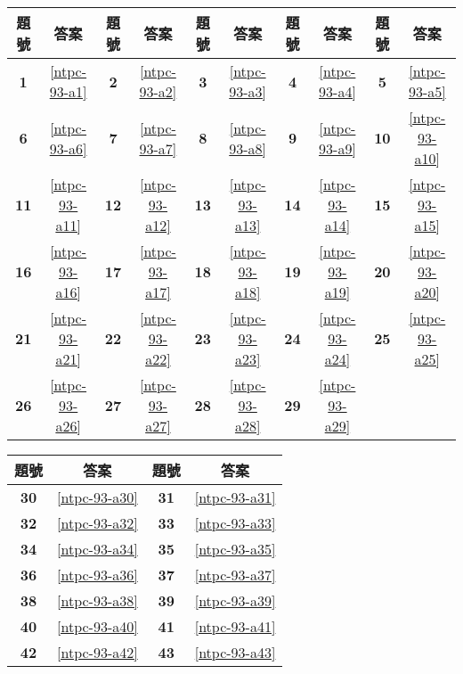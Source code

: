 \documentclass[12pt,a4paper]{report}
\begin{document}
\begin{CJK}{UTF8}{bkai}
\begin{table}[h]
  \center
  \begin{tabular}{|c|c|c|c|c|c|c|c|c|c|}
  \hline
  題號 & 答案 & 題號 & 答案 & 題號 & 答案 & 題號 & 答案 & 題號 & 答案\\
  \hline\hline
  \textbf{1}  & \ref{ntpc-93-a1} & \textbf{2}  & \ref{ntpc-93-a2} & \textbf{3}  & \ref{ntpc-93-a3} & \textbf{4}  & \ref{ntpc-93-a4} & \textbf{5}  & \ref{ntpc-93-a5}\\
  \hline
  \textbf{6}  & \ref{ntpc-93-a6} & \textbf{7}  & \ref{ntpc-93-a7} & \textbf{8}  & \ref{ntpc-93-a8} & \textbf{9}  & \ref{ntpc-93-a9} & \textbf{10} & \ref{ntpc-93-a10}\\
  \hline
  \textbf{11} & \ref{ntpc-93-a11} & \textbf{12} & \ref{ntpc-93-a12} & \textbf{13} & \ref{ntpc-93-a13} & \textbf{14} & \ref{ntpc-93-a14} & \textbf{15} & \ref{ntpc-93-a15}\\
  \hline
  \textbf{16} & \ref{ntpc-93-a16} & \textbf{17} & \ref{ntpc-93-a17} & \textbf{18} & \ref{ntpc-93-a18} & \textbf{19} & \ref{ntpc-93-a19} & \textbf{20} & \ref{ntpc-93-a20}\\
  \hline
  \textbf{21} & \ref{ntpc-93-a21} & \textbf{22} & \ref{ntpc-93-a22} & \textbf{23} & \ref{ntpc-93-a23} & \textbf{24} & \ref{ntpc-93-a24} & \textbf{25} & \ref{ntpc-93-a25}\\
  \hline
  \textbf{26} & \ref{ntpc-93-a26} & \textbf{27} & \ref{ntpc-93-a27} & \textbf{28} & \ref{ntpc-93-a28} & \textbf{29} & \ref{ntpc-93-a29} & &\\
  \hline
  \end{tabular}
\end{table}

\begin{table}[h]
  \center
  \begin{tabular}{|c|c|c|c|}
  \hline
  題號 & 答案 & 題號 & 答案\\
  \hline\hline
  \textbf{30} & \ref{ntpc-93-a30} & \textbf{31} & \ref{ntpc-93-a31}\\
  \hline
  \textbf{32} & \ref{ntpc-93-a32} & \textbf{33} & \ref{ntpc-93-a33}\\
  \hline
  \textbf{34} & \ref{ntpc-93-a34} & \textbf{35} & \ref{ntpc-93-a35}\\
  \hline
  \textbf{36} & \ref{ntpc-93-a36} & \textbf{37} & \ref{ntpc-93-a37}\\
  \hline
  \textbf{38} & \ref{ntpc-93-a38} & \textbf{39} & \ref{ntpc-93-a39}\\
  \hline
  \textbf{40} & \ref{ntpc-93-a40} & \textbf{41} & \ref{ntpc-93-a41}\\
  \hline
  \textbf{42} & \ref{ntpc-93-a42} & \textbf{43} & \ref{ntpc-93-a43}\\
  \hline
  \end{tabular}
\end{table}

\end{CJK}
\end{document}
